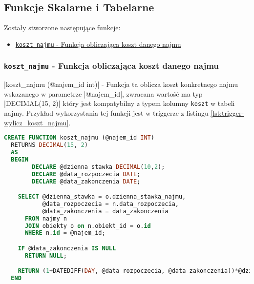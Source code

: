 \subsection{Funkcje Skalarne i Tabelarne}

Zostały stworzone następujące funkcje:
\begin{itemize}
	\item \href{run:Sources/SQL/3. Funkcje Skalarne/017_Utworzenie_funkcji_wyliczajacej_koszt_najmu.sql}{\texttt{koszt\_najmu} - Funkcja obliczająca koszt danego najmu}
\end{itemize}

\subsubsection{\texttt{koszt\_najmu} - Funkcja obliczająca koszt danego najmu}

|koszt_najmu (@najem_id int)| - Funkcja ta oblicza koszt konkretnego najmu wskazanego w parametrze |@najem_id|, zwracana wartość ma typ |DECIMAL(15, 2)| który jest kompatybilny z typem kolumny \texttt{koszt} w tabeli \texttt{}najmy. Przykład wykorzystania tej funkcji jest w triggerze z listingu \ref{lst:trigger-wylicz_koszt_najmu}.


\begin{lstlisting}[language=SQL, caption={Skrypt tworzący funkcję skalarną \texttt{koszt\_najmu}}, label={lst:function-koszt_najmu}]
CREATE FUNCTION koszt_najmu (@najem_id INT)
  RETURNS DECIMAL(15, 2)
  AS
  BEGIN
		DECLARE @dzienna_stawka DECIMAL(10,2);
		DECLARE @data_rozpoczecia DATE;
		DECLARE @data_zakonczenia DATE;

    SELECT @dzienna_stawka = o.dzienna_stawka_najmu,
           @data_rozpoczecia = n.data_rozpoczecia,
           @data_zakonczenia = data_zakonczenia
      FROM najmy n
      JOIN obiekty o on n.obiekt_id = o.id
      WHERE n.id = @najem_id;

    IF @data_zakonczenia IS NULL
      RETURN NULL;

    RETURN (1+DATEDIFF(DAY, @data_rozpoczecia, @data_zakonczenia))*@dzienna_stawka;
  END
\end{lstlisting}